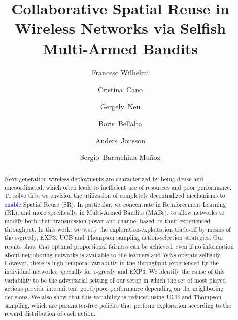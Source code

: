 \documentclass[preprint,12pt]{elsarticle}
\newcommand{\francesc}[1]{\textcolor{blue}{#1}}
\begin{document}
\begin{frontmatter}



\title{Collaborative Spatial Reuse in Wireless Networks via Selfish Multi-Armed Bandits}

\author[label1, label4]{Francesc Wilhelmi}
\author[label2]{Cristina~Cano}
\author[label3]{Gergely~Neu}
\author[label1]{Boris~Bellalta} 
\author[label3]{Anders~Jonsson}
\author[label1]{Sergio~Barrachina-Mu\~noz}
\address[label1]{Wireless Networking Research Group (WN-UPF), 08002 Barcelona, Spain}
\address[label2]{Wireless Networks Research Group (WINE-UOC), 08860 Castelldefels (Barelona), Spain}
\address[label3]{Artificial Intelligence and Machine Learning Research Group (AIML-UPF), 08002 Barcelona, Spain}

\begin{abstract}
Next-generation wireless deployments are characterized by being dense and uncoordinated, which often leads to inefficient use of resources and poor performance. To solve this, we envision the utilization of completely decentralized mechanisms to \francesc{enable} Spatial Reuse (SR). In particular, we concentrate in Reinforcement Learning (RL), and more specifically, in Multi-Armed Bandits (MABs), to allow networks to modify both their transmission power and channel based on their experienced throughput. In this work, we study the exploration-exploitation trade-off by means of the $\varepsilon$-greedy, EXP3, UCB and Thompson sampling action-selection strategies. Our results show that optimal proportional fairness can be achieved, even if no information about neighboring networks is available to the learners and WNs operate selfishly. However, there is high temporal variability in the throughput experienced by the individual networks, specially for $\varepsilon$-greedy and EXP3. We identify the cause of this variability to be the adversarial setting of our setup in which the set of most played actions provide intermittent good/poor performance depending on the neighboring decisions. We also show that this variability is reduced using UCB and Thompson sampling, which are parameter-free policies that perform exploration according to the reward distribution of each action.
\end{abstract}


\end{frontmatter}
\end{document}
